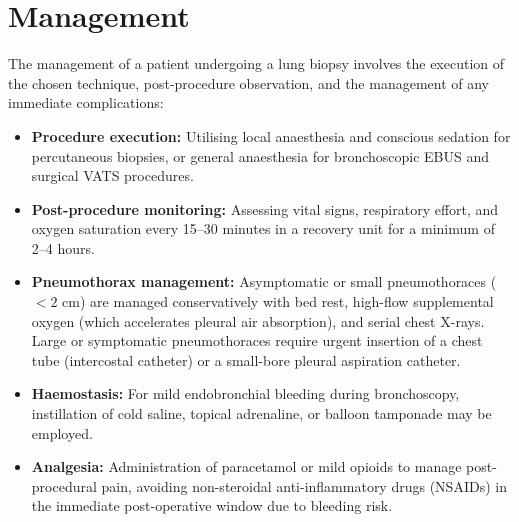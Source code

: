\section*{Management}
The management of a patient undergoing a lung biopsy involves the execution of the chosen technique, post-procedure observation, and the management of any immediate complications:
\begin{itemize}
    \item \textbf{Procedure execution:} Utilising local anaesthesia and conscious sedation for percutaneous biopsies, or general anaesthesia for bronchoscopic EBUS and surgical VATS procedures.
    \item \textbf{Post-procedure monitoring:} Assessing vital signs, respiratory effort, and oxygen saturation every 15--30 minutes in a recovery unit for a minimum of 2--4 hours.
    \item \textbf{Pneumothorax management:} Asymptomatic or small pneumothoraces ( $<2$ cm) are managed conservatively with bed rest, high-flow supplemental oxygen (which accelerates pleural air absorption), and serial chest X-rays. Large or symptomatic pneumothoraces require urgent insertion of a chest tube (intercostal catheter) or a small-bore pleural aspiration catheter.
    \item \textbf{Haemostasis:} For mild endobronchial bleeding during bronchoscopy, instillation of cold saline, topical adrenaline, or balloon tamponade may be employed.
    \item \textbf{Analgesia:} Administration of paracetamol or mild opioids to manage post-procedural pain, avoiding non-steroidal anti-inflammatory drugs (NSAIDs) in the immediate post-operative window due to bleeding risk.
\end{itemize}

